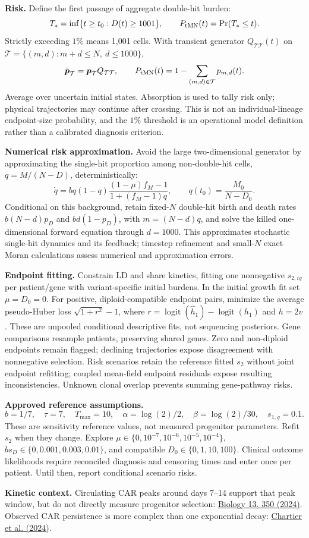 \documentclass[10pt]{article}
\begin{document}
\newpage
\textbf{Risk.} Define the first passage of aggregate double-hit burden:
\[
T_*=\inf\{t\ge t_0:D(t)\ge1001\},\qquad
P_{\rm tMN}(t)=\Pr(T_*\le t).
\]
Strictly exceeding \(1\%\) means 1,001 cells. With transient generator \(Q_{\mathcal T\mathcal T}(t)\) on
\(\mathcal T=\{(m,d):m+d\le N,\ d\le1000\}\),
\[
\dot{\boldsymbol p}_{\mathcal T}
 =\boldsymbol p_{\mathcal T}Q_{\mathcal T\mathcal T},\qquad
P_{\rm tMN}(t)=1-\sum_{(m,d)\in\mathcal T}p_{m,d}(t).
\]
Average over uncertain initial states. Absorption is used to tally risk only; physical trajectories may continue after crossing. This is not an individual-lineage endpoint-size probability, and the \(1\%\) threshold is an operational model definition rather than a calibrated diagnosis criterion.

\textbf{Numerical risk approximation.} Avoid the large two-dimensional generator by approximating the single-hit proportion among non-double-hit cells, \(q=M/(N-D)\), deterministically:
\[
\dot q=bq(1-q)\frac{(1-\mu)f_M-1}{1+(f_M-1)q},\qquad
q(t_0)=\frac{M_0}{N-D_0}.
\]
Conditional on this background, retain fixed-\(N\) double-hit birth and death rates \(b(N-d)p_D\) and \(bd(1-p_D)\), with \(m=(N-d)q\), and solve the killed one-dimensional forward equation through \(d=1000\). This approximates stochastic single-hit dynamics and its feedback; timestep refinement and small-\(N\) exact Moran calculations assess numerical and approximation errors.

\textbf{Endpoint fitting.} Constrain LD and share kinetics, fitting one nonnegative \(s_{2,ig}\) per patient/gene with variant-specific initial burdens. In the initial growth fit set \(\mu=D_0=0\). For positive, diploid-compatible endpoint pairs, minimize the average pseudo-Huber loss \(\sqrt{1+r^2}-1\), where \(r=\operatorname{logit}(\hat h_1)-\operatorname{logit}(h_1)\) and \(h=2v\). These are unpooled conditional descriptive fits, not sequencing posteriors. Gene comparisons resample patients, preserving shared genes. Zero and non-diploid endpoints remain flagged; declining trajectories expose disagreement with nonnegative selection. Risk scenarios retain the reference fitted \(s_2\) without joint endpoint refitting; coupled mean-field endpoint residuals expose resulting inconsistencies. Unknown clonal overlap prevents summing gene-pathway risks.

\textbf{Approved reference assumptions.}
\[
b=1/7,\quad \tau=7,\quad T_{\max}=10,\quad
\alpha=\log(2)/2,\quad \beta=\log(2)/30,\quad s_{1,g}=0.1.
\]
These are sensitivity reference values, not measured progenitor parameters. Refit \(s_2\) when they change. Explore \(\mu\in\{0,10^{-7},10^{-6},10^{-5},10^{-4}\}\),
\(b s_D\in\{0,0.001,0.003,0.01\}\), and compatible \(D_0\in\{0,1,10,100\}\).
Clinical outcome likelihoods require reconciled diagnosis and censoring times and enter once per patient. Until then, report conditional scenario risks.

\small
\textbf{Kinetic context.} Circulating CAR peaks around days 7--14 support that peak window, but do not directly measure progenitor selection:
\href{https://doi.org/10.3390/biology13050350}{Biology 13, 350 (2024)}.
Observed CAR persistence is more complex than one exponential decay:
\href{https://pubmed.ncbi.nlm.nih.gov/39240498/}{Chartier et al. (2024)}.
\end{document}
